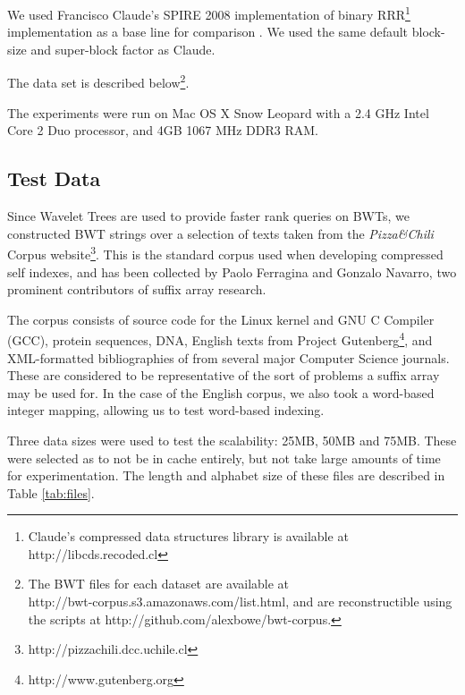 We used Francisco Claude's SPIRE 2008 implementation of binary 
RRR\footnote{Claude's compressed data 
structures library is available at http://libcds.recoded.cl} implementation as a 
base line for comparison \cite{claude2008}. We used the same default block-size 
and super-block factor as Claude.

The data set is described below\footnote{The BWT files for each dataset are 
available at\\ http://bwt-corpus.s3.amazonaws.com/list.html, and are 
reconstructible using the scripts at http://github.com/alexbowe/bwt-corpus.}.

The experiments were run on Mac OS X Snow Leopard with a 2.4 GHz Intel Core 2
Duo processor, and 4GB 1067 MHz DDR3 RAM.

\subsection{Test Data}
Since Wavelet Trees are used to provide faster rank queries on BWTs, we
constructed BWT strings over a selection of texts taken from the \emph{Pizza\&Chili}
Corpus website\footnote{http://pizzachili.dcc.uchile.cl}. This is the standard
corpus used when developing compressed self indexes, and has been collected by
Paolo Ferragina and Gonzalo Navarro, two prominent contributors of suffix array 
research.

The corpus consists of source code for the Linux kernel and GNU C Compiler
(GCC), protein sequences, DNA, English texts from Project
Gutenberg\footnote{http://www.gutenberg.org}, and XML-formatted bibliographies
of from several major Computer Science journals. These are considered to be
representative of the sort of problems a suffix array may be used for. In the 
case of the English corpus, we also took a word-based integer mapping, allowing 
us to test word-based indexing.

Three data sizes were used to test the scalability: 25MB, 50MB and 75MB. 
These were selected as to not be in cache entirely, but not take large amounts 
of time for experimentation. The length and alphabet size of these files are 
described in Table \ref{tab:files}.

